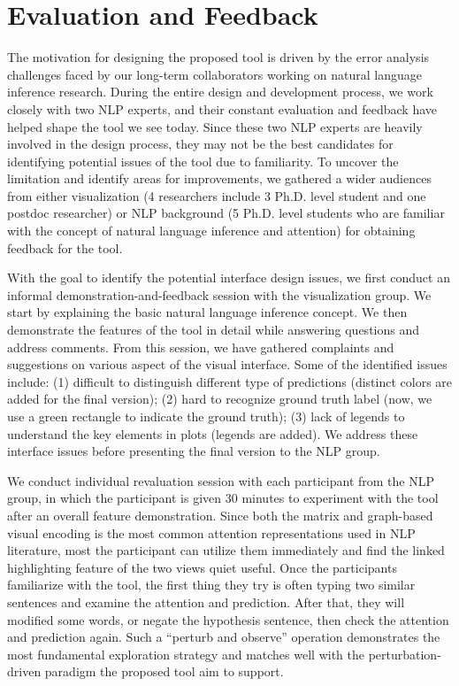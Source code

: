 \section{Evaluation and Feedback}
The motivation for designing the proposed tool is driven by the error analysis challenges faced by our long-term collaborators working on natural language inference research. During the entire design and development process, we work closely with two NLP experts, and their constant evaluation and feedback have helped shape the tool we see today. 
%
Since these two NLP experts are heavily involved in the design process, they may not be the best candidates for identifying potential issues of the tool due to familiarity.  To uncover the limitation and identify areas for improvements, we gathered a wider audiences from either visualization (4 researchers include 3 Ph.D. level student and one postdoc researcher) or NLP background (5 Ph.D. level students who are familiar with the concept of natural language inference and attention) for obtaining feedback for the tool.  

With the goal to identify the potential interface design issues, we first conduct an informal demonstration-and-feedback session with the visualization group. We start by explaining the basic natural language inference concept. We then demonstrate the features of the tool in detail while answering questions and address comments.
%
From this session, we have gathered complaints and suggestions on various aspect of the visual interface. Some of the identified issues include: (1) difficult to distinguish different type of predictions (distinct colors are added for the final version); (2) hard to recognize ground truth label (now, we use a green rectangle to indicate the ground truth); (3) lack of legends to understand the key elements in plots (legends are added). We address these interface issues before presenting the final version to the NLP group.

We conduct individual revaluation session with each participant from the NLP group, in which the participant is given 30 minutes to experiment with the tool after an overall feature demonstration. 
%
Since both the matrix and graph-based visual encoding is the most common attention representations used in NLP literature, most the participant can utilize them immediately and find the linked highlighting feature of the two views quiet useful.
% 
Once the participants familiarize with the tool, the first thing they try is often typing two similar sentences and examine the attention and prediction. After that, they will modified some words, or negate the hypothesis sentence, then check the attention and prediction again.
%
Such a ``perturb and observe'' operation demonstrates the most fundamental exploration strategy and matches well with the perturbation-driven paradigm the proposed tool aim to support.

